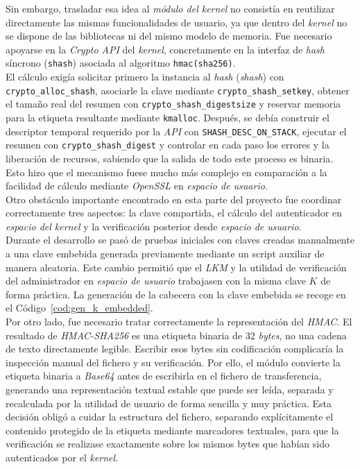 Sin embargo, trasladar esa idea al \textit{módulo del kernel} no consistía en reutilizar directamente las mismas funcionalidades de usuario, ya que dentro del \textit{kernel} no se dispone de las bibliotecas ni del mismo modelo de memoria.
Fue necesario apoyarse en la \textit{Crypto API} del \textit{kernel}, concretamente en la interfaz de \textit{hash} síncrono (\texttt{shash}) asociada al algoritmo \texttt{hmac(sha256)}.\\

El cálculo exigía solicitar primero la instancia al \textit{hash} (\textit{shash}) con \verb|crypto_alloc_shash|, asociarle la clave mediante \verb|crypto_shash_setkey|, obtener el tamaño real del resumen con \verb|crypto_shash_digestsize| y reservar memoria para la etiqueta resultante mediante \verb|kmalloc|.
Después, se debía construir el descriptor temporal requerido por la \textit{API} con \verb|SHASH_DESC_ON_STACK|, ejecutar el resumen con \verb|crypto_shash_digest| y controlar en cada paso los errores y la liberación de recursos, sabiendo que la salida de todo este proceso es binaria.
Esto hizo que el mecanismo fuese mucho más complejo en comparación a la facilidad de cálculo mediante \textit{OpenSSL} en \textit{espacio de usuario}.\\

Otro obstáculo importante encontrado en esta parte del proyecto fue coordinar correctamente tres aspectos: la clave compartida, el cálculo del autenticador en \textit{espacio del kernel} y la verificación posterior desde \textit{espacio de usuario}.\\

Durante el desarrollo se pasó de pruebas iniciales con claves creadas manualmente a una clave embebida generada previamente mediante un script auxiliar de manera aleatoria.
Este cambio permitió que el \textit{LKM} y la utilidad de verificación del administrador en \textit{espacio de usuario} trabajasen con la misma clave \(K\) de forma práctica.
La generación de la cabecera con la clave embebida se recoge en el Código~\ref{cod:gen_k_embedded}.\\

Por otro lado, fue necesario tratar correctamente la representación del \textit{HMAC}.
El resultado de \textit{HMAC-SHA256} es una etiqueta binaria de 32 \textit{bytes}, no una cadena de texto directamente legible.
Escribir esos bytes sin codificación complicaría la inspección manual del fichero y su verificación.
Por ello, el módulo convierte la etiqueta binaria a \textit{Base64} antes de escribirla en el fichero de transferencia, generando una representación textual estable que puede ser leída, separada y recalculada por la utilidad de usuario de forma sencilla y muy práctica.
Esta decisión obligó a cuidar la estructura del fichero, separando explícitamente el contenido protegido de la etiqueta mediante marcadores textuales, para que la verificación se realizase exactamente sobre los mismos bytes que habían sido autenticados por el \textit{kernel}.\\

